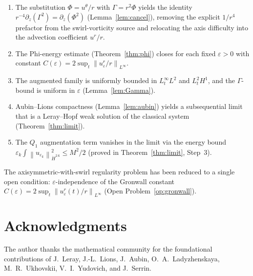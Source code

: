 \documentclass{article}
\theoremstyle{definition}
\theoremstyle{remark}
\newcommand{\e}{\varepsilon}
\newcommand{\norm}[1]{\left\|#1\right\|}
\begin{document}
\begin{enumerate}
  \item The substitution $\Phi = u^\theta/r$ with $\Gamma = r^2\Phi$
    yields the identity $r^{-4}\partial_z(\Gamma^2) = \partial_z(\Phi^2)$
    (Lemma~\ref{lem:cancel}), removing the explicit $1/r^4$ prefactor from
    the swirl-vorticity source and relocating the axis difficulty into the
    advection coefficient $u^r/r$.
    
  \item The Phi-energy estimate (Theorem~\ref{thm:phi}) closes for each
    fixed $\e > 0$ with constant $C(\e) = 2\sup_t\norm{u_\e^r/r}_{L^\infty}$.
    
  \item The augmented family is uniformly bounded in $L^\infty_t L^2$
    and $L^2_t H^1$, and the $\Gamma$-bound is uniform in $\e$
    (Lemma~\ref{lem:Gamma}).
    
  \item Aubin--Lions compactness (Lemma~\ref{lem:aubin}) yields
    a subsequential limit that is a Leray--Hopf weak solution of the
    classical system (Theorem~\ref{thm:limit}).
    
  \item The $Q_1$ augmentation term vanishes in the limit via the
    energy bound $\e_k\int\norm{u_{\e_k}}_{\dot H^{2.6}}^2 \le M^2/2$
    (proved in Theorem~\ref{thm:limit}, Step~3).
\end{enumerate}

\noindent
The axisymmetric-with-swirl regularity problem has been reduced to a
single open condition: $\e$-independence of the Gronwall constant
$C(\e) = 2\sup_t\norm{u_\e^r(t)/r}_{L^\infty}$ (Open Problem~\ref{op:gronwall}).

\section*{Acknowledgments}

The author thanks the mathematical community for the foundational
contributions of J.~Leray, J.-L.~Lions, J.~Aubin, O.~A.~Ladyzhenskaya,
M.~R.~Ukhovskii, V.~I.~Yudovich, and J.~Serrin.
\end{document}
